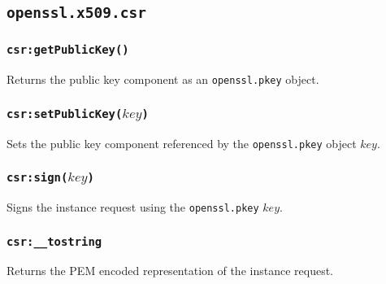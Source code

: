 \documentclass[11pt, oneside]{memoir}
\newcommand*{\fn}[1]{\texttt{#1}\xspace}
\newcommand*{\module}[1]{\texttt{#1}\xspace}
\newcounter{toccols}
\newenvironment{Module}[1]{
	\subsection{\texttt{#1}}
	\addtocontents{toc}{
		\protect\begin{multicols}{\value{toccols}}
	}
}{
	\addtocontents{toc}{\protect\end{multicols}}
}
\begin{document}
\begin{Module}{openssl.x509.csr}
\subsubsection[\fn{csr:getPublicKey}]{\fn{csr:getPublicKey()}}

Returns the public key component as an \module{openssl.pkey} object.

\subsubsection[\fn{csr:setPublicKey}]{\fn{csr:setPublicKey($key$)}}

Sets the public key component referenced by the \module{openssl.pkey} object $key$.

\subsubsection[\fn{csr:sign}]{\fn{csr:sign($key$)}}

Signs the instance request using the \module{openssl.pkey} $key$.

\subsubsection[\fn{csr:\_\_tostring}]{\fn{csr:\_\_tostring}}

Returns the PEM encoded representation of the instance request.

\end{Module}
\end{document}
